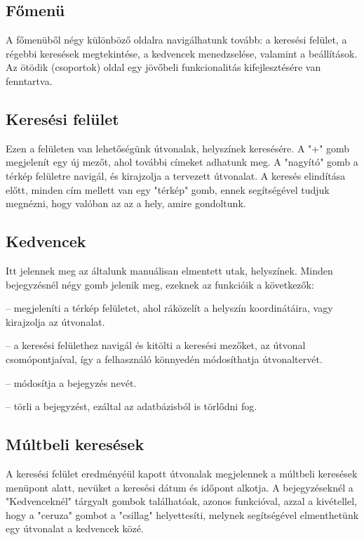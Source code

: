 \subsection{Főmenü}

A főmenüből négy különböző oldalra navigálhatunk tovább: a keresési felület, a régebbi keresések megtekintése, a kedvencek menedzselése, valamint a beállítások. Az ötödik (csoportok) oldal egy jövőbeli funkcionalitás kifejlesztésére van fenntartva.

\subsection{Keresési felület}

Ezen a felületen van lehetőségünk útvonalak, helyszínek keresésére. A "+" gomb megjelenít egy új mezőt, ahol további címeket adhatunk meg. A "nagyító" gomb a térkép felületre navigál, és kirajzolja a tervezett útvonalat. A keresés elindítása előtt, minden cím mellett van egy "térkép" gomb, ennek segítségével tudjuk megnézni, hogy valóban az az a hely, amire gondoltunk.

\subsection{Kedvencek}
 
 Itt jelennek meg az általunk manuálisan elmentett utak, helyszínek. Minden bejegyzésnél négy gomb jelenik meg, ezeknek az funkcióik a következők:
 
 \begin{description}
 	\setlength{\itemsep}{0.04mm}
 	\item[térkép] -- megjeleníti a térkép felületet, ahol ráközelít a helyszín koordinátáira, vagy kirajzolja az útvonalat.
 	\item[nagyító] -- a keresési felülethez navigál és kitölti a keresési mezőket, az útvonal csomópontjaíval, így a felhasználó könnyedén módosíthatja útvonaltervét.
 	\item[ceruza] -- módosítja a bejegyzés nevét.
 	\item[szemetes veder] -- törli a bejegyzést, ezáltal az adatbázisból is törlődni fog.
 \end{description}

\subsection{Múltbeli keresések}

A keresési felület eredményéül kapott útvonalak megjelennek a múltbeli keresések menüpont alatt, nevüket a keresési dátum és időpont alkotja. A bejegyzéseknél a "Kedvenceknél" tárgyalt gombok találhatóak, azonos funkcióval, azzal a kivétellel, hogy a "ceruza" gombot a "csillag" helyettesíti, melynek segítségével elmenthetünk egy útvonalat a kedvencek közé.

